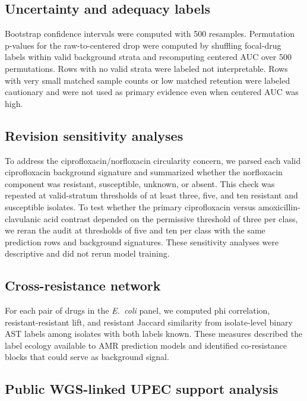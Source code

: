 \documentclass[11pt]{article}
\begin{document}
\subsection*{Uncertainty and adequacy labels}

Bootstrap confidence intervals were computed with 500 resamples. Permutation p-values for the raw-to-centered drop were computed by shuffling focal-drug labels within valid background strata and recomputing centered AUC over 500 permutations. Rows with no valid strata were labeled not interpretable. Rows with very small matched sample counts or low matched retention were labeled cautionary and were not used as primary evidence even when centered AUC was high.

\subsection*{Revision sensitivity analyses}

To address the ciprofloxacin/norfloxacin circularity concern, we parsed each valid ciprofloxacin background signature and summarized whether the norfloxacin component was resistant, susceptible, unknown, or absent. This check was repeated at valid-stratum thresholds of at least three, five, and ten resistant and susceptible isolates. To test whether the primary ciprofloxacin versus amoxicillin-clavulanic acid contrast depended on the permissive threshold of three per class, we reran the audit at thresholds of five and ten per class with the same prediction rows and background signatures. These sensitivity analyses were descriptive and did not rerun model training.

\subsection*{Cross-resistance network}

For each pair of drugs in the \textit{E.~coli} panel, we computed phi correlation, resistant-resistant lift, and resistant Jaccard similarity from isolate-level binary AST labels among isolates with both labels known. These measures described the label ecology available to AMR prediction models and identified co-resistance blocks that could serve as background signal.

\subsection*{Public WGS-linked UPEC support analysis}
\end{document}
